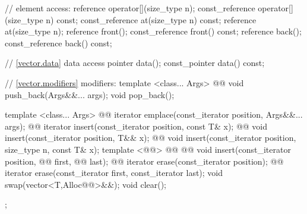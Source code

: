 \documentclass[american,twoside]{book}
\begin{document}
\begin{codeblock}
{{    // element access:
    reference       operator[](size_type n);
    const_reference operator[](size_type n) const;
    const_reference at(size_type n) const;
    reference       at(size_type n);
    reference       front();
    const_reference front() const;
    reference       back();
    const_reference back() const;

    // \ref{vector.data} data access
    pointer         data();
    const_pointer   data() const;

    // \ref{vector.modifiers} modifiers:
    template <class... Args> 
      @@
      void push_back(Args&&... args);
    void pop_back();

    template <class... Args> 
      @@
      iterator emplace(const_iterator position, Args&&... args);
    @@ 
      iterator insert(const_iterator position, const T& x);
    @@
      void insert(const_iterator position, T&& x);
    @@
      void insert(const_iterator position, size_type n, const T& x);
    template <@@>
        @@
              @@
        void insert(const_iterator position,
                    @@ first, @@ last);
    @@ iterator erase(const_iterator position);
    @@ iterator erase(const_iterator first, const_iterator last);
    void     swap(vector<T,Alloc@@>&&);
    void     clear();
  };

}
\end{codeblock}
\end{document}
